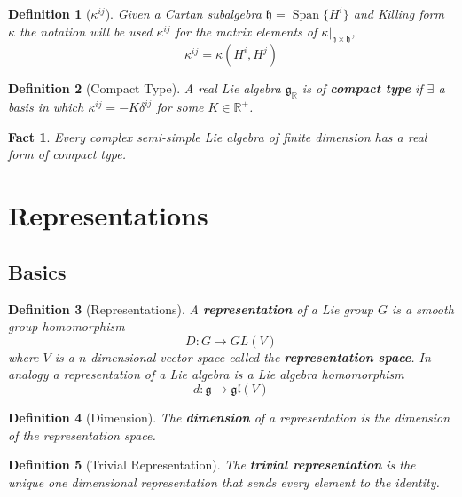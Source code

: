 \documentclass{article}
\newtheorem{definition}{Definition}[subsection]
\newtheorem{fact}{Fact}[subsection]
\DeclareMathOperator{\spn}{Span}
\newcommand{\bam}[1]{\textbf{#1}}
\newcommand{\mf}[1]{\mathfrak{#1}}
\begin{document}
\begin{definition}[$\kappa^{ij}$]
Given a Cartan subalgebra $\mf{h}=\spn\lbrace H^i \rbrace$ and Killing form $\kappa$ the notation will be used $\kappa^{ij}$ for the matrix elements of $\kappa |_{\mf{h}\times\mf{h}}$,
\[
\kappa^{ij}=\kappa(H^i, H^j)
\]
\end{definition}

\begin{definition}[Compact Type]
A real Lie algebra $\mf{g}_\mathbb{R}$ is of \bam{compact type} if $\exists$ a basis in which $\kappa^{ij}=-K\delta^{ij}$ for some $K\in\mathbb{R}^{+}$.
\end{definition}

\begin{fact}
Every complex semi-simple Lie algebra of finite dimension has a real form of compact type.
\end{fact}

\section{Representations}

\subsection{Basics}

\begin{definition}[Representations]
A \bam{representation} of a Lie group $G$ is a smooth group homomorphism 
\[
D:G\to GL\left(V\right)
\]
where $V$ is a $n$-dimensional vector space called the \bam{representation space}.
In analogy a representation of a Lie algebra is a Lie algebra homomorphism 
\[
d:\mf{g} \to \mf{gl}\left(V\right)
\]
\end{definition}

\begin{definition}[Dimension]
The \bam{dimension} of a representation is the dimension of the representation space.
\end{definition}

\begin{definition}[Trivial Representation] 
The \bam{trivial representation} is the unique one dimensional representation that sends every element to the identity. 
\end{definition}
\end{document}
